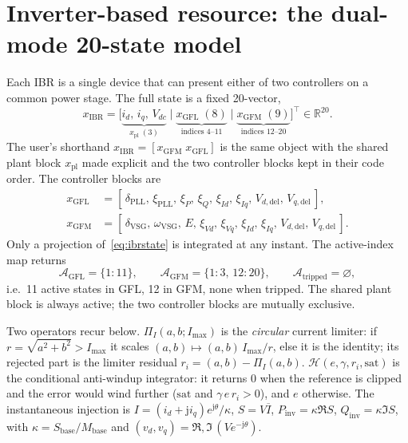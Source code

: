 \documentclass[12pt,a4paper]{article}
\begin{document}
\section{Inverter-based resource: the dual-mode 20-state model}\label{sec:ibr}
Each IBR is a single device that can present either of two controllers on a
common power stage. The full state is a fixed 20-vector,
\begin{equation}
  x_{\mathrm{IBR}}
   =\bigl[\underbrace{i_d,\,i_q,\,V_{dc}}_{x_{\mathrm{pl}}\;(3)}\;\big|\;
          \underbrace{x_{\mathrm{GFL}}\;(8)}_{\text{indices }4\text{--}11}\;\big|\;
          \underbrace{x_{\mathrm{GFM}}\;(9)}_{\text{indices }12\text{--}20}\bigr]^{\top}
   \in\mathbb{R}^{20}.
   \label{eq:ibrstate}
\end{equation}
The user's shorthand $x_{\mathrm{IBR}}=[x_{\mathrm{GFM}}\;x_{\mathrm{GFL}}]$ is the
same object with the shared plant block $x_{\mathrm{pl}}$ made explicit and the
two controller blocks kept in their code order. The controller blocks are
\begin{align}
  x_{\mathrm{GFL}}&=[\,\delta_{\mathrm{PLL}},\,\xi_{\mathrm{PLL}},\,\xi_P,\,\xi_Q,
      \,\xi_{Id},\,\xi_{Iq},\,V_{d,\mathrm{del}},\,V_{q,\mathrm{del}}\,],\\
  x_{\mathrm{GFM}}&=[\,\delta_{\mathrm{VSG}},\,\omega_{\mathrm{VSG}},\,E,
      \,\xi_{Vd},\,\xi_{Vq},\,\xi_{Id},\,\xi_{Iq},
      \,V_{d,\mathrm{del}},\,V_{q,\mathrm{del}}\,].
\end{align}
Only a projection of~\eqref{eq:ibrstate} is integrated at any instant. The
active-index map returns
\begin{equation}
  \mathcal{A}_{\mathrm{GFL}}=\{1{:}11\},\qquad
  \mathcal{A}_{\mathrm{GFM}}=\{1{:}3,\,12{:}20\},\qquad
  \mathcal{A}_{\mathrm{tripped}}=\varnothing,
  \label{eq:ibractive}
\end{equation}
i.e.\ 11 active states in GFL, 12 in GFM, none when tripped. The shared plant
block is always active; the two controller blocks are mutually exclusive.

Two operators recur below. $\Pi_I(a,b;I_{\max})$ is the \emph{circular} current
limiter: if $r=\sqrt{a^2+b^2}>I_{\max}$ it scales $(a,b)\mapsto(a,b)\,I_{\max}/r$,
else it is the identity; its rejected part is the limiter residual
$r_i=(a,b)-\Pi_I(a,b)$. $\mathcal{H}(e,\gamma,r_i,\text{sat})$ is the conditional
anti-windup integrator: it returns $0$ when the reference is clipped and the
error would wind further ($\text{sat}$ and $\gamma\,e\,r_i>0$), and $e$ otherwise.
The instantaneous injection is $I=(i_d+\mathrm{j}i_q)e^{\mathrm{j}\theta}/\kappa$,
$S=V\overline{I}$, $P_{\mathrm{inv}}=\kappa\Re S$, $Q_{\mathrm{inv}}=\kappa\Im S$,
with $\kappa=S_{\mathrm{base}}/M_{\mathrm{base}}$ and $(v_d,v_q)=\Re,\Im\,(Ve^{-\mathrm{j}\theta})$.
\end{document}
